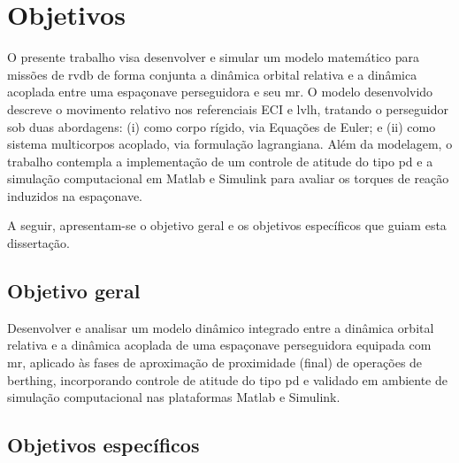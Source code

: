 
\section{Objetivos}
\label{sec_objetivos}

O presente trabalho visa desenvolver e simular um modelo matemático para missões de \gls{rvdb} de forma conjunta a dinâmica orbital relativa e a dinâmica acoplada entre uma espaçonave perseguidora e seu \gls{mr}.
O modelo desenvolvido descreve o movimento relativo nos referenciais ECI e \gls{lvlh}, tratando o perseguidor sob duas abordagens:
(i) como corpo rígido, via Equações de Euler; e
(ii) como sistema multicorpos acoplado, via formulação lagrangiana.
Além da modelagem, o trabalho contempla a implementação de um controle de atitude do tipo \gls{pd} e a simulação computacional em Matlab e Simulink para avaliar os torques de reação induzidos na espaçonave.

A seguir, apresentam-se o objetivo geral e os objetivos específicos que guiam esta dissertação.


\subsection{Objetivo geral}
\label{subsec_objetivo_geral}

Desenvolver e analisar um modelo dinâmico integrado entre a dinâmica orbital relativa e a dinâmica acoplada de uma espaçonave perseguidora equipada com \gls{mr}, aplicado às fases de aproximação de proximidade (final) de operações de berthing, incorporando controle de atitude do tipo \gls{pd} e validado em ambiente de simulação computacional nas plataformas Matlab e Simulink.




\subsection{Objetivos específicos}
\label{subsec_objetivos_especificos}

